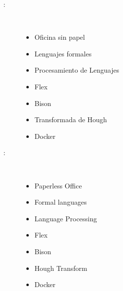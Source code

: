 \begin{multicols}{2}
\begin{description}
\item [\palabraschaveprincipal:] \mbox{} \\[-20pt]
  \begin{itemize}
      \item Oficina sin papel 
      \item Lenguajes formales
      \item Procesamiento de Lenguajes
      \item Flex
      \item Bison
      \item Transformada de Hough
      \item Docker
  \end{itemize}
\end{description}
\begin{description}
\item [\palabraschavesecundaria:] \mbox{} \\[-20pt]
  \begin{itemize}
      \item Paperless Office
      \item Formal languages
      \item Language Processing      
      \item Flex
      \item Bison
      \item Hough Transform
      \item Docker      
  \end{itemize}

\end{description}
\end{multicols}
